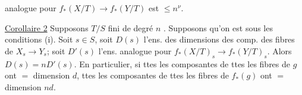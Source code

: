 analogue pour $f_*(X/T)\to f_*(Y/T)$ est $\leq n^\nu$.


\uline{Corollaire 2} Supposons $T/S$ fini de degré $n$ .
Supposons qu'on est sous les conditions (i).
Soit  $s\in S$, soit $D(s)$ l'ens. des dimensions des  comp. des fibres de $X_s\to Y_s$;  soit $D'(s)$ l'ens. analogue pour $f_*(X/T)_s\to f_*(Y/T)_s$. Alors $D(s)=nD'(s)$.
En particulier, si ttes les composantes de ttes les fibres de $g$ ont $=$ dimension $d$,  ttes les composantes de ttes les fibres de $f_*(g)$ ont $=$ dimension $nd$.
